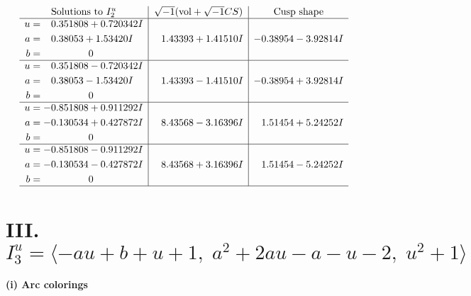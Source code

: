 \documentclass[1p]{elsarticle_modified}
\theoremstyle{definition}
\newcommand{\I}{\sqrt{-1}}
\begin{document}
$$\begin{array}{c|c|c}  
\text{Solutions to }I^u_{2}& \I (\text{vol} + \sqrt{-1}CS) & \text{Cusp shape}\\
 \hline 
\begin{aligned}
u &= \phantom{-}0.351808 + 0.720342 I \\
a &= \phantom{-}0.38053 + 1.53420 I \\
b &= \phantom{-0.000000 } 0\end{aligned}
 & \phantom{-}1.43393 + 1.41510 I & -0.38954 - 3.92814 I \\ \hline\begin{aligned}
u &= \phantom{-}0.351808 - 0.720342 I \\
a &= \phantom{-}0.38053 - 1.53420 I \\
b &= \phantom{-0.000000 } 0\end{aligned}
 & \phantom{-}1.43393 - 1.41510 I & -0.38954 + 3.92814 I \\ \hline\begin{aligned}
u &= -0.851808 + 0.911292 I \\
a &= -0.130534 + 0.427872 I \\
b &= \phantom{-0.000000 } 0\end{aligned}
 & \phantom{-}8.43568 - 3.16396 I & \phantom{-}1.51454 + 5.24252 I \\ \hline\begin{aligned}
u &= -0.851808 - 0.911292 I \\
a &= -0.130534 - 0.427872 I \\
b &= \phantom{-0.000000 } 0\end{aligned}
 & \phantom{-}8.43568 + 3.16396 I & \phantom{-}1.51454 - 5.24252 I\\
 \hline 
 \end{array}$$\newpage\newpage\renewcommand{\arraystretch}{1}
\centering \section*{III. $I^u_{3}= \langle - a u+b+u+1,\;a^2+2 a u- a- u-2,\;u^2+1 \rangle$}
\flushleft \textbf{(i) Arc colorings}\\
\end{document}
